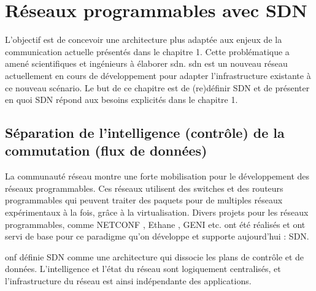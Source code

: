 \chapter{Réseaux programmables avec SDN}

L'objectif est de concevoir une architecture plus adaptée aux enjeux de la communication actuelle présentés dans le chapitre 1. Cette problématique a amené scientifiques et ingénieurs à élaborer \gls{sdn}. \gls{sdn} est un nouveau  réseau actuellement en cours de développement pour adapter l'infrastructure existante à ce nouveau scénario.
Le but de ce chapitre est de (re)définir SDN et de présenter en quoi SDN répond aux besoins explicités dans le chapitre 1.


\section{Séparation de l'intelligence (contrôle) de la commutation (flux de données)}

La communauté réseau montre une forte mobilisation pour le développement des réseaux programmables. Ces réseaux utilisent des switches et des routeurs programmables qui peuvent traiter des paquets pour de multiples réseaux expérimentaux  à la fois, grâce à la \gls{virtualisation}. \cite{OpenFlowStanfordOssification} Divers projets pour les réseaux programmables, comme NETCONF \cite{NETCONF}, Ethane \cite{Ethane}, GENI \cite{GENI} etc. ont été réalisés et ont servi de base pour ce paradigme qu'on développe et supporte aujourd'hui : SDN. 


\gls{onf} définie SDN comme  une architecture qui dissocie les plans de contrôle et de données. L'intelligence et l'état du réseau sont logiquement centralisés, et l'infrastructure du réseau est ainsi indépendante des applications. \cite{SDNNewNormONFExecutiveSummary}


